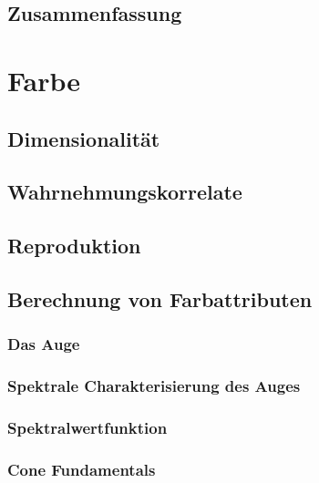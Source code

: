 \documentclass[a4paper, 11pt, accentcolor = tud3b]{tudreport}
\begin{document}
		\section{Zusammenfassung} %

	\chapter{Farbe} %

		\section{Dimensionalität} %

		\section{Wahrnehmungskorrelate} %

		\section{Reproduktion} %

		\section{Berechnung von Farbattributen} %

			\subsection{Das Auge} %

			\subsection{Spektrale Charakterisierung des Auges} %

			\subsection{Spektralwertfunktion} %

			\subsection{Cone Fundamentals} %
\end{document}
